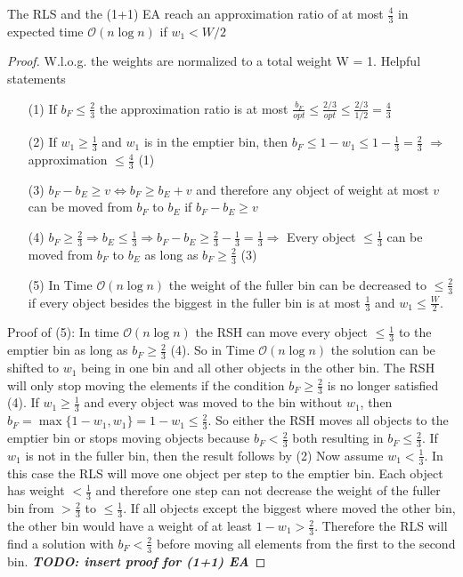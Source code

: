 \begin{lemma}\label{approximationLemma}
    The RLS and the (1+1) EA reach an approximation ratio of at most $\frac{4}{3}$ in expected time $\mathcal{O}(n\log{}n)$ if $w_1 < W/2$
\end{lemma}
\begin{proof}
    W.l.o.g. the weights are normalized to a total weight W = 1.
    \newline Helpful statements
    \begin{itemize}
        \item[(1)]\label{helpPoint1} If \(b_F \le \frac{2}{3}\) the approximation ratio is at most \(\frac{b_F}{opt} \le \frac{2/3}{opt} \le \frac{2/3}{1/2} = \frac{4}{3}\)
        \item[(2)]\label{helpPoint2} If \(w_1 \ge \frac{1}{3}\) and \(w_1\) is in the emptier bin, then \( b_F \le 1 - w_1 \le 1 - \frac{1}{3} = \frac{2}{3} \) \newline $\Rightarrow$ approximation \(\le \frac{4}{3}\) (1)
        \item[(3)]\label{helpPoint3} \(b_F - b_E \ge v \Leftrightarrow b_F \ge b_E + v\) and therefore any object of weight at most $v$ can be moved from $b_F$ to $b_E$ if \(b_F - b_E \ge v\)
        \item[(4)]\label{helpPoint4} \(b_F \ge \frac{2}{3} \Rightarrow b_E \le \frac{1}{3} \Rightarrow b_F - b_E \ge \frac{2}{3} - \frac{1}{3} = \frac{1}{3} \Rightarrow\) Every object \(\le \frac{1}{3}\) can be moved from $b_F$ to $b_E$ as long as \(b_F \ge \frac{2}{3}\) (3)
        \item[(5)]\label{helpPoint5} In Time $\mathcal{O}(n\log{}n)$ the weight of the fuller bin can be decreased to \(\le \frac{2}{3}\) if every object besides the biggest in the fuller bin is at most $\frac{1}{3}$ and \(w_1 \le \frac{W}{2}\).
    \end{itemize}
    Proof of (5): \newline
    In time $\mathcal{O}(n\log{}n)$ the RSH can move every object $\le \frac{1}{3}$ to the emptier bin as long as $b_F \ge \frac{2}{3}$ (4). So in Time $\mathcal{O}(n\log{}n)$ the solution can be shifted to $w_1$ being in one bin and all other objects in the other bin. The RSH will only stop moving the elements if the condition $b_F \ge \frac{2}{3}$ is no longer satisfied (4). If \(w_1 \ge \frac{1}{3}\) and every object was moved to the bin without $w_1$, then \(b_F = \max\{1-w_1, w_1\} = 1-w_1 \le \frac{2}{3}\). So either the RSH moves all objects to the emptier bin or stops moving objects because $b_F < \frac{2}{3}$ both resulting in $b_F \le \frac{2}{3}$. If $w_1$ is not in the fuller bin, then the result follows by (2)\newline
    Now assume \(w_1 < \frac{1}{3}\). In this case the RLS will move one object per step to the emptier bin. Each object has weight $< \frac{1}{3}$ and therefore one step can not decrease the weight of the fuller bin from $> \frac{2}{3}$ to $\le \frac{1}{3}$. If all objects except the biggest where moved the other bin, the other bin would have a weight of at least \(1-w_1 > \frac{2}{3}\). Therefore the RLS will find a solution with $b_F < \frac{2}{3}$ before moving all elements from the first to the second bin. \textbf{\textit{TODO: insert proof for (1+1) EA}}



\end{proof}
